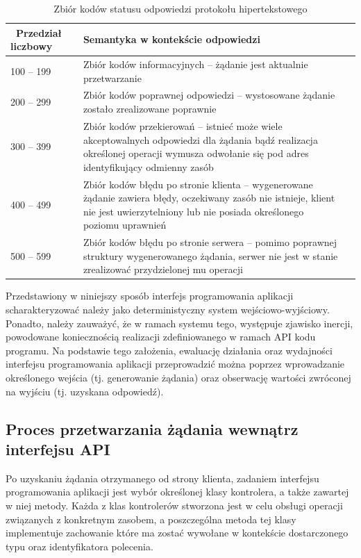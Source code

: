 \begin{table}[htbp] \small
\centering
\caption{Zbiór kodów statusu odpowiedzi protokołu hipertekstowego}
\label{tab:kody-odpowiedzi}
\begin{tabularx}{\linewidth}{|p{4cm}|X|X|} \hline\
Przedział liczbowy & Semantyka w kontekście odpowiedzi\\ \hline\hline
100 -- 199 & Zbiór kodów informacyjnych -- żądanie jest aktualnie przetwarzanie\\ \hline
200 -- 299 & Zbiór kodów poprawnej odpowiedzi -- wystosowane żądanie zostało zrealizowane poprawnie \\ \hline
300 -- 399 & Zbiór kodów przekierowań -- istnieć może wiele akceptowalnych odpowiedzi dla żądania bądź realizacja określonej operacji wymusza odwołanie się pod adres identyfikujący odmienny zasób \\ \hline
400 -- 499 & Zbiór kodów błędu po stronie klienta -- wygenerowane żądanie zawiera błędy, oczekiwany zasób nie istnieje, klient nie jest uwierzytelniony lub nie posiada określonego poziomu uprawnień \\ \hline
500 -- 599 & Zbiór kodów błędu po stronie serwera -- pomimo poprawnej struktury wygenerowanego żądania, serwer nie jest w stanie zrealizować przydzielonej mu operacji\\ \hline
\end{tabularx}
\end{table}

Przedstawiony w niniejszy sposób interfejs programowania aplikacji scharakteryzować należy jako deterministyczny system wejściowo-wyjściowy. Ponadto, należy zauważyć, że w ramach systemu tego, występuje zjawisko inercji, powodowane koniecznością realizacji zdefiniowanego w ramach API kodu programu. Na podstawie tego założenia, ewaluację działania oraz wydajności interfejsu programowania aplikacji przeprowadzić można poprzez wprowadzanie określonego wejścia (tj. generowanie żądania) oraz obserwację wartości zwróconej na wyjściu (tj. uzyskana odpowiedź).

\subsection*{Proces przetwarzania żądania wewnątrz interfejsu API}
Po uzyskaniu żądania otrzymanego od strony klienta, zadaniem interfejsu programowania aplikacji jest wybór określonej klasy kontrolera, a także zawartej w niej metody. Każda z klas kontrolerów stworzona jest w celu obsługi operacji związanych z konkretnym zasobem, a poszczególna metoda tej klasy implementuje zachowanie które ma zostać wywołane w kontekście dostarczonego typu oraz identyfikatora polecenia.

